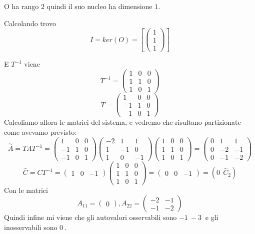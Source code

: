 \documentclass{article}
\begin{document}
O ha rango $ 2 $ quindi il suo nucleo ha dimensione $ 1 $.

Calcolando trovo \[ 
I = ker(O) = \left[ \left(\begin{matrix}1\\1\\1\end{matrix}\right)\right]\]

E $T^{-1}$ viene \[ 
T^{-1} = \left(\begin{matrix}1 & 0 & 0\\1 & 1 & 0\\1 & 0 & 1\end{matrix}\right) \]
\[ 
T = \left(\begin{matrix}1 & 0 & 0\\-1 & 1 & 0\\-1 & 0 & 1\end{matrix}\right) \]Calcoliamo allora le matrici del sistema, e vedremo che risultano partizionate come avevamo previsto:
\[ 
\overset{\sim}{A} = T A  T^{-1} = \left(\begin{matrix}1 & 0 & 0\\-1 & 1 & 0\\-1 & 0 & 1\end{matrix}\right)\left(\begin{matrix}-2 & 1 & 1\\1 & -1 & 0\\1 & 0 & -1\end{matrix}\right)\left(\begin{matrix}1 & 0 & 0\\1 & 1 & 0\\1 & 0 & 1\end{matrix}\right) = \left(\begin{matrix}0 & 1 & 1\\0 & -2 & -1\\0 & -1 & -2\end{matrix}\right) \]
\[ 
\overset{\sim}{C} = CT^{-1} = \left(\begin{matrix}1 & 0 & -1\end{matrix}\right)\left(\begin{matrix}1 & 0 & 0\\1 & 1 & 0\\1 & 0 & 1\end{matrix}\right) = \left(\begin{matrix}0 & 0 & -1\end{matrix}\right) = ( 0\ \ \overset{\sim}{C}_2) \]
Con le matrici \[ A_{11} = \left(\begin{matrix}0\end{matrix}\right) , A_{22} = \left(\begin{matrix}-2 & -1\\-1 & -2\end{matrix}\right) \]Quindi infine mi viene che gli autovalori osservabili sono $ -1\ -3\  $ e gli inosservabili sono $ 0\  $.
\end{document}
